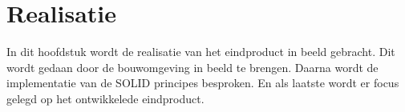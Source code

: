 \chapter{Realisatie}
In dit hoofdstuk wordt de realisatie van het eindproduct in beeld gebracht.
Dit wordt gedaan door de bouwomgeving in beeld te brengen.
Daarna wordt de implementatie van de SOLID principes besproken.
En als laatste wordt  er focus gelegd op het ontwikkelede eindproduct.


\newpage

% 

